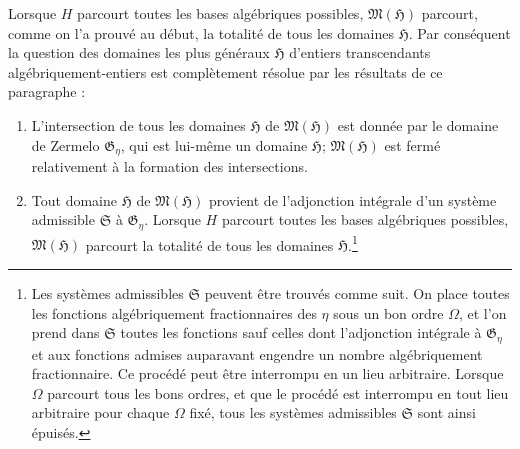 Lorsque $H$ parcourt toutes les bases algébriques possibles, $\mathfrak M(\mathfrak H)$ parcourt, comme on l'a prouvé au début, la totalité de tous les domaines $\mathfrak H$. Par conséquent la question des domaines les plus généraux $\mathfrak H$ d'entiers transcendants algébriquement-entiers est complètement résolue par les résultats de ce paragraphe :
\begin{enumerate}
\item[a)] L'intersection de tous les domaines $\mathfrak H$ de $\mathfrak M(\mathfrak H)$ est donnée par le domaine de Zermelo $\mathfrak G_\eta$, qui est lui-même un domaine $\mathfrak H$; $\mathfrak M(\mathfrak H)$ est fermé relativement à la formation des intersections.
\item[b)] Tout domaine $\mathfrak H$ de $\mathfrak M(\mathfrak H)$ provient de l'adjonction intégrale d'un système admissible $\mathfrak S$ à $\mathfrak G_\eta$. Lorsque $H$ parcourt toutes les bases algébriques possibles, $\mathfrak M(\mathfrak H)$ parcourt la totalité de tous les domaines $\mathfrak H$.\footnote{Les systèmes admissibles $\mathfrak S$ peuvent être trouvés comme suit. On place toutes les fonctions algébriquement fractionnaires des $\eta$ sous un bon ordre $\Omega$, et l'on prend dans $\mathfrak S$ toutes les fonctions sauf celles dont l'adjonction intégrale à $\mathfrak G_\eta$ et aux fonctions admises auparavant engendre un nombre algébriquement fractionnaire. Ce procédé peut être interrompu en un lieu arbitraire. Lorsque $\Omega$ parcourt tous les bons ordres, et que le procédé est interrompu en tout lieu arbitraire pour chaque $\Omega$ fixé, tous les systèmes admissibles $\mathfrak S$ sont ainsi épuisés.}
\end{enumerate}
